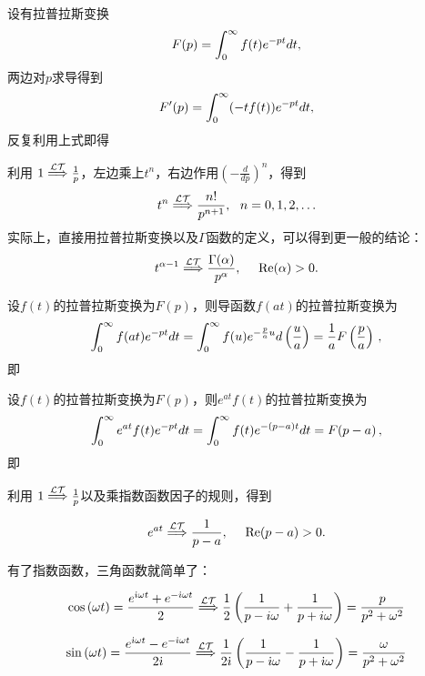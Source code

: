 \documentclass[CJK]{beamer}
\begin{document}
\begin{frame}
\bch
设有拉普拉斯变换
$$ F(p) = \int_0^\infty f(t) e^{-pt} dt, $$
两边对$p$求导得到
$$ F'(p) = \int_0^\infty (-tf(t)) e^{-pt} dt, $$
反复利用上式即得
\ech
\end{frame}


\begin{frame}
  \bch
  利用 $1 \stackrel{\mathcal{LT}}{\Longrightarrow} \frac{1}{p} $，左边乘上$t^n$，右边作用$\left(-\frac{d}{dp}\right)^n$，得到
   $$ t^n \ltf \frac{n!}{p^{n+1}},\ \ n=0,1,2,\ldots $$
  实际上，直接用拉普拉斯变换以及$\Gamma$函数的定义，可以得到更一般的结论：
  {\blue  $$ t^{\alpha-1} \stackrel{\mathcal{LT}}{\Longrightarrow} \frac{\Gamma(\alpha)}{p^{\alpha}},\ \ \ \ \mathrm{Re}(\alpha) >  0.$$}
  
  \ech
\end{frame}

\begin{frame}
\bch
设$f(t)$的拉普拉斯变换为$F(p)$，则导函数$f(at)$的拉普拉斯变换为
$$\int_0^\infty f(at) e^{-pt} dt =  \int_0^\infty f(u) e^{-\frac{p}{a}u} d\left(\frac{u}{a}\right) = \frac{1}{a}F\left(\frac{p}{a}\right)\,,$$
即
\ech
\end{frame}

\begin{frame}
\bch
设$f(t)$的拉普拉斯变换为$F(p)$，则$e^{at}f(t)$的拉普拉斯变换为
$$\int_0^\infty e^{at}f(t) e^{-pt} dt  = \int_0^\infty f(t) e^{-(p-a)t} dt  = F(p-a)\,,$$
即
\ech
\end{frame}

\begin{frame}
  \bch
  利用 $1 \stackrel{\mathcal{LT}}{\Longrightarrow} \frac{1}{p} $以及乘指数函数因子的规则，得到

  {\blue  $$ e^{at} \ltf \frac{1}{p-a},\ \ \ \ \mathrm{Re}(p-a)>0.$$}
  \ech
\end{frame}


\begin{frame}
  \bch
  有了指数函数，三角函数就简单了：{\blue
  $$ \cos{(\omega t)} = \frac{e^{{\dot{\imath}} \omega t}+e^{-{\dot{\imath}} \omega t}}{2}  \stackrel{\mathcal{LT}}{\Longrightarrow} \frac{1}{2}\left(\frac{1}{p-i\omega} +  \frac{1}{p+i\omega}\right) = \frac{p}{p^2+\omega^2} $$

  $$ \sin{(\omega t)} = \frac{e^{{\dot{\imath}} \omega t}-e^{-{\dot{\imath}} \omega t}}{2{\dot{\imath}}}  \stackrel{\mathcal{LT}}{\Longrightarrow} \frac{1}{2{\dot{\imath}}}\left(\frac{1}{p-{\dot{\imath}}\omega} - \frac{1}{p+{\dot{\imath}}\omega}\right) = \frac{\omega}{p^2+\omega^2} $$}
  \ech
\end{frame}
\end{document}

